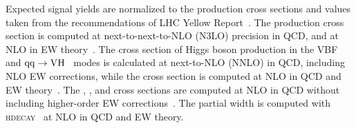 \begin{table}[!htb]
    \centering
    \captionsetup{justification=centering}
    \label{tab:sig_samples}
\end{table}

Expected signal yields are normalized to the production cross sections and \brhmm values taken from the recommendations of LHC Yellow Report~\cite{deFlorian:2016spz}.
The \ggH production cross section is computed at next-to-next-to-NLO (N3LO) precision in QCD, and at NLO in EW theory~\cite{Anastasiou:2016cez}. 
The cross section of Higgs boson production in the VBF~\cite{Cacciari:2015jma} and ${\mathrm{q}\mathrm{q}\to\mathrm{V}\mathrm{H}}$~\cite{Brein:2003wg} modes is calculated at next-to-NLO (NNLO) in QCD, 
including NLO EW corrections, while the \ttH cross section is computed at NLO in QCD and EW theory~\cite{Dawson:2003zu,Frixione:2014qaa}. 
The \bbH, \tHq, and \tHW cross sections are computed at NLO in QCD without including higher-order EW corrections~\cite{deFlorian:2016spz,Demartin:2015uha,Demartin:2016axk}. 
The \hmm partial width is computed with \textsc{hdecay}~\cite{Djouadi:1997yw,Spira:1997dg} at NLO in QCD and EW theory.

